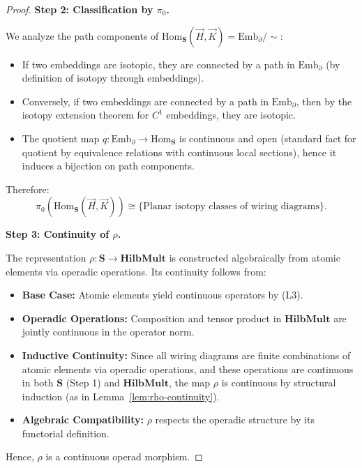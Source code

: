 \documentclass[11pt]{article}
\begin{document}
\begin{proof}
\medskip\noindent
\textbf{Step 2: Classification by $\pi_0$.}

We analyze the path components of $\mathrm{Hom}_{\mathbf{S}}(\vec{H}, \vec{K}) = \mathrm{Emb}_\partial/\!\!\sim$:

\begin{itemize}
    \item If two embeddings are isotopic, they are connected by a path in $\mathrm{Emb}_\partial$ (by definition of isotopy through embeddings).
    \item Conversely, if two embeddings are connected by a path in $\mathrm{Emb}_\partial$, then by the isotopy extension theorem for $C^1$ embeddings, they are isotopic.
    \item The quotient map $q: \mathrm{Emb}_\partial \to \mathrm{Hom}_{\mathbf{S}}$ is continuous and open (standard fact for quotient by equivalence relations with continuous local sections), hence it induces a bijection on path components.
\end{itemize}

Therefore:
\[
\pi_0\left(\mathrm{Hom}_{\mathbf{S}}(\vec{H}, \vec{K})\right) \cong \{\text{Planar isotopy classes of wiring diagrams}\}.
\]

\medskip\noindent
\textbf{Step 3: Continuity of $\rho$.}

The representation $\rho: \mathbf{S} \to \mathbf{HilbMult}$ is constructed algebraically from atomic elements via operadic operations. Its continuity follows from:

\begin{itemize}
    \item \textbf{Base Case:} Atomic elements yield continuous operators by (L3).
    \item \textbf{Operadic Operations:} Composition and tensor product in $\mathbf{HilbMult}$ are jointly continuous in the operator norm.
    \item \textbf{Inductive Continuity:} Since all wiring diagrams are finite combinations of atomic elements via operadic operations, and these operations are continuous in both $\mathbf{S}$ (Step 1) and $\mathbf{HilbMult}$, the map $\rho$ is continuous by structural induction (as in Lemma~\ref{lem:rho-continuity}).
    \item \textbf{Algebraic Compatibility:} $\rho$ respects the operadic structure by its functorial definition.
\end{itemize}

Hence, $\rho$ is a continuous operad morphism.
\end{proof}
\end{document}
